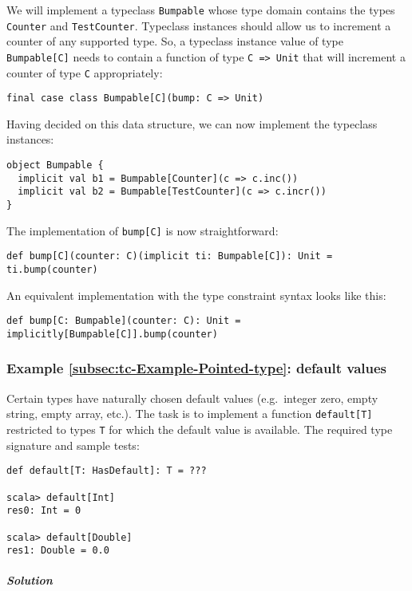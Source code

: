 We will implement a typeclass \lstinline!Bumpable! whose type domain
contains the types \lstinline!Counter! and \lstinline!TestCounter!.
Typeclass instances should allow us to increment a counter of any
supported type. So, a typeclass instance value of type \lstinline!Bumpable[C]!
needs to contain a function of type \lstinline!C => Unit! that will
increment a counter of type \lstinline!C! appropriately:
\begin{lstlisting}
final case class Bumpable[C](bump: C => Unit)
\end{lstlisting}
Having decided on this data structure, we can now implement the typeclass
instances:
\begin{lstlisting}
object Bumpable {
  implicit val b1 = Bumpable[Counter](c => c.inc())
  implicit val b2 = Bumpable[TestCounter](c => c.incr())
}
\end{lstlisting}
The implementation of \lstinline!bump[C]! is now straightforward:
\begin{lstlisting}
def bump[C](counter: C)(implicit ti: Bumpable[C]): Unit = ti.bump(counter)
\end{lstlisting}
An equivalent implementation with the type constraint syntax looks
like this:
\begin{lstlisting}
def bump[C: Bumpable](counter: C): Unit = implicitly[Bumpable[C]].bump(counter)
\end{lstlisting}


\subsubsection{Example \label{subsec:tc-Example-Pointed-type}\ref{subsec:tc-Example-Pointed-type}:
default values}

Certain types have naturally chosen default values (e.g.~integer
zero, empty string, empty array, etc.). The task is to implement a
function \lstinline!default[T]! restricted to types \lstinline!T!
for which the default value is available. The required type signature
and sample tests:
\begin{lstlisting}
def default[T: HasDefault]: T = ???

scala> default[Int]
res0: Int = 0

scala> default[Double]
res1: Double = 0.0
\end{lstlisting}


\subparagraph{Solution}

